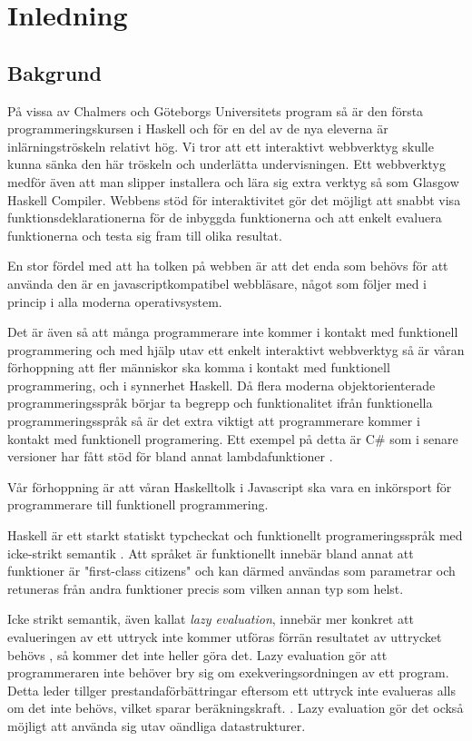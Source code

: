 ﻿\section{Inledning}

\subsection{Bakgrund}
På vissa av Chalmers och Göteborgs Universitets program så är den första programmeringskursen i Haskell \citep{haskell98} och för en del av de nya eleverna är inlärningströskeln relativt hög. Vi tror att ett interaktivt webbverktyg skulle kunna sänka den här tröskeln och underlätta undervisningen. Ett webbverktyg medför även att man slipper installera och lära sig extra verktyg så som Glasgow Haskell Compiler. Webbens stöd för interaktivitet gör det möjligt att snabbt visa funktionsdeklarationerna för de inbyggda funktionerna och att enkelt evaluera funktionerna och testa sig fram till olika resultat.

En stor fördel med att ha tolken på webben är att det enda som behövs för att använda den är en javascriptkompatibel webbläsare, något som följer med i princip i alla moderna operativsystem.

Det är även så att många programmerare inte kommer i kontakt med funktionell programmering  och med hjälp utav ett enkelt interaktivt webbverktyg så är våran förhoppning att fler människor ska komma i kontakt med funktionell programmering, och i synnerhet Haskell. Då flera moderna objektorienterade programmeringsspråk börjar ta begrepp och funktionalitet ifrån funktionella programmeringsspråk så är det extra viktigt att programmerare kommer i kontakt med funktionell programering. Ett exempel på detta är C\# som i senare versioner har fått stöd för bland annat lambdafunktioner \citep{csharp}. 

Vår förhoppning är att våran Haskelltolk i Javascript ska vara en inkörsport för programmerare till funktionell programmering.

Haskell är ett starkt statiskt typcheckat och funktionellt programeringsspråk med icke-strikt semantik . Att språket är funktionellt innebär bland annat att funktioner är "first-class citizens" och kan därmed användas som parametrar och retuneras från andra funktioner precis som vilken annan typ som helst.

Icke strikt semantik, även kallat \emph{lazy evaluation}, innebär mer konkret att evalueringen av ett uttryck inte kommer utföras förrän resultatet av uttrycket behövs , så kommer det inte heller göra det.
Lazy evaluation gör att programmeraren inte behöver bry sig om exekveringsordningen av ett program. Detta leder tillger prestandaförbättringar eftersom ett uttryck inte evalueras alls om det inte behövs, vilket sparar beräkningskraft. \citep{hudak89}.
Lazy evaluation gör det också möjligt att använda sig utav oändliga datastrukturer. %

